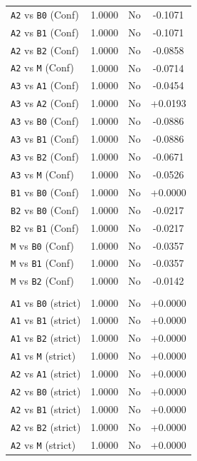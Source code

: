 \begin{longtable}{lccc}
\texttt{A2} vs \texttt{B0} (Conf) & 1.0000 & No & -0.1071 \\
\texttt{A2} vs \texttt{B1} (Conf) & 1.0000 & No & -0.1071 \\
\texttt{A2} vs \texttt{B2} (Conf) & 1.0000 & No & -0.0858 \\
\texttt{A2} vs \texttt{M} (Conf) & 1.0000 & No & -0.0714 \\
\texttt{A3} vs \texttt{A1} (Conf) & 1.0000 & No & -0.0454 \\
\texttt{A3} vs \texttt{A2} (Conf) & 1.0000 & No & +0.0193 \\
\texttt{A3} vs \texttt{B0} (Conf) & 1.0000 & No & -0.0886 \\
\texttt{A3} vs \texttt{B1} (Conf) & 1.0000 & No & -0.0886 \\
\texttt{A3} vs \texttt{B2} (Conf) & 1.0000 & No & -0.0671 \\
\texttt{A3} vs \texttt{M} (Conf) & 1.0000 & No & -0.0526 \\
\texttt{B1} vs \texttt{B0} (Conf) & 1.0000 & No & +0.0000 \\
\texttt{B2} vs \texttt{B0} (Conf) & 1.0000 & No & -0.0217 \\
\texttt{B2} vs \texttt{B1} (Conf) & 1.0000 & No & -0.0217 \\
\texttt{M} vs \texttt{B0} (Conf) & 1.0000 & No & -0.0357 \\
\texttt{M} vs \texttt{B1} (Conf) & 1.0000 & No & -0.0357 \\
\texttt{M} vs \texttt{B2} (Conf) & 1.0000 & No & -0.0142 \\
\addlinespace
\multicolumn{4}{l}{\textit{All pairwise strict success (Holm-corrected)}} \\
\addlinespace
\texttt{A1} vs \texttt{B0} (strict) & 1.0000 & No & +0.0000 \\
\texttt{A1} vs \texttt{B1} (strict) & 1.0000 & No & +0.0000 \\
\texttt{A1} vs \texttt{B2} (strict) & 1.0000 & No & +0.0000 \\
\texttt{A1} vs \texttt{M} (strict) & 1.0000 & No & +0.0000 \\
\texttt{A2} vs \texttt{A1} (strict) & 1.0000 & No & +0.0000 \\
\texttt{A2} vs \texttt{B0} (strict) & 1.0000 & No & +0.0000 \\
\texttt{A2} vs \texttt{B1} (strict) & 1.0000 & No & +0.0000 \\
\texttt{A2} vs \texttt{B2} (strict) & 1.0000 & No & +0.0000 \\
\texttt{A2} vs \texttt{M} (strict) & 1.0000 & No & +0.0000 \\

\end{longtable}
